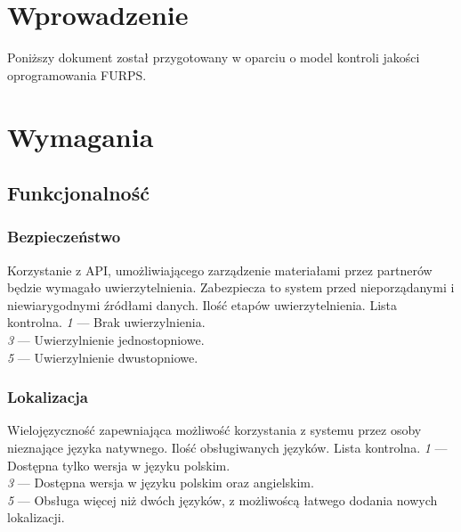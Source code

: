 \documentclass[10pt]{dokument-ppi}
\begin{document}
\MakeDokumentMeta


\section{Wprowadzenie}

Poniższy dokument został przygotowany w oparciu o model kontroli jakości
oprogramowania \textsc{FURPS}.


\section{Wymagania}

\subsection{Funkcjonalność}

\subsubsection{Bezpieczeństwo}
\begin{requirement}
    \desc%
        Korzystanie z API, umożliwiającego zarządzenie materiałami przez
        partnerów będzie wymagało uwierzytelnienia. Zabezpiecza to system przed
        nieporządanymi i niewiarygodnymi źródłami danych.
    \metric%
        Ilość etapów uwierzytelnienia.
    \tool%
        Lista kontrolna.
    \scale%
        \emph{1} --- Brak uwierzylnienia.\\
        \emph{3} --- Uwierzylnienie jednostopniowe.\\
        \emph{5} --- Uwierzylnienie dwustopniowe.
\end{requirement}

\subsubsection{Lokalizacja}
\begin{requirement}
    \desc%
        Wielojęzyczność zapewniająca możliwość korzystania z systemu przez osoby
        nieznające języka natywnego.
    \metric%
        Ilość obsługiwanych języków.
    \tool%
        Lista kontrolna.
    \scale%
        \emph{1} --- Dostępna tylko wersja w języku polskim.\\
        \emph{3} --- Dostępna wersja w języku polskim oraz angielskim.\\
        \emph{5} --- Obsługa więcej niż dwóch języków, z możliwoścą łatwego
            dodania nowych lokalizacji.
\end{requirement}
\end{document}
